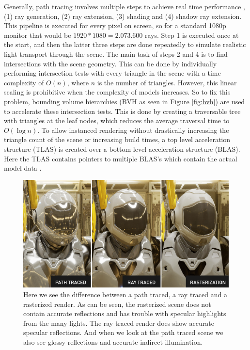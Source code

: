 Generally, path tracing involves multiple steps to achieve real time performance \cite{laine2013megakernels}, (1) ray generation, (2) ray extension, (3) shading and (4) shadow ray extension. This pipeline is executed for every pixel on screen, so for a standard 1080p monitor that would be $1920*1080=2.073.600$ rays. Step 1 is executed once at the start, and then the latter three steps are done repeatedly to simulate realistic light transport through the scene. The main task of steps 2 and 4 is to find intersections with the scene geometry. This can be done by individually performing intersection tests with every triangle in the scene with a time complexity of $O(n)$, where $n$ is the number of triangles. However, this linear scaling is prohibitive when the complexity of models increases. So to fix this problem, bounding volume hierarchies (BVH as seen in Figure \ref{fig:bvh}) are used to accelerate these intersection tests. This is done by creating a traversable tree with triangles at the leaf nodes, which reduces the average traversal time to  $O(\log n)$. To allow instanced rendering without drastically increasing the triangle count of the scene or increasing build times, a top level acceleration structure (TLAS) is created over a bottom level acceleration structure (BLAS). Here the TLAS contains pointers to multiple BLAS's which contain the actual model data \cite{VulkanAccelerationStructures}.

\begin{figure}
    \centering
    \includegraphics[width=\linewidth]{figures/nvidia_ray_path_rasterization.png}
    \caption{Here we see the difference between a path traced, a ray traced and a rasterized render. As can be seen, the rasterized scene does not contain accurate reflections and has trouble with specular highlights from the many lights. The ray traced render does show accurate specular reflections. And when we look at the path traced scene we also see glossy reflections and accurate indirect illumination. \cite{NVIDIAPathRayRaster}}
    \label{fig:path_ray_raster}
\end{figure}

